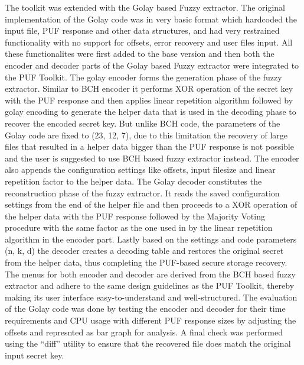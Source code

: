 The toolkit was extended with the Golay based Fuzzy extractor. The original implementation of the Golay code was in very basic format which hardcoded the input file, PUF response and other data structures, and had very restrained functionality with no support for offsets, error recovery and user files input. All these functionalites were first added to the base version and then both the encoder and decoder parts of the Golay based Fuzzy extractor were integrated to the PUF Toolkit. The
golay encoder forms the generation phase of the fuzzy extractor. Similar to BCH encoder it performs XOR operation of the secret key with the PUF response and then applies linear repetition algorithm followed by golay encoding to generate the helper data that is used in the decoding phase to recover the encoded secret key. But unlike BCH code, the parameters of the Golay code are fixed to (23, 12, 7), due to this limitation the recovery of large files that resulted in a helper data bigger than
the PUF response is not possible and the user is suggested to use BCH based fuzzy extractor instead. The encoder also appends the configuration settings like offsets, input filesize and linear repetition factor to the helper data. The Golay decoder constitutes the reconstruction phase of the fuzzy extractor. It reads the saved configuration settings from the end of the helper file and then proceeds to a XOR operation of the helper
data with the PUF response followed by the Majority Voting procedure with the same factor as the one used in by the linear repetition algorithm in the encoder part. Lastly based on the settings and code parameters (n, k, d) the decoder creates a decoding table and restores the original secret from the helper data, thus completing the PUF-based secure storage recovery. The menus for both encoder and decoder are derived from the BCH based fuzzy extractor and
adhere to the same design guidelines as the PUF Toolkit, thereby making its user interface easy-to-understand and well-structured. The evaluation of the Golay code was done by testing the encoder and decoder for their time requirements and CPU usage with different PUF response sizes by adjusting the offsets and represnted as bar graph for analysis. A final check was performed using the ``diff'' utility to ensure that the recovered file does match the original input secret key.

